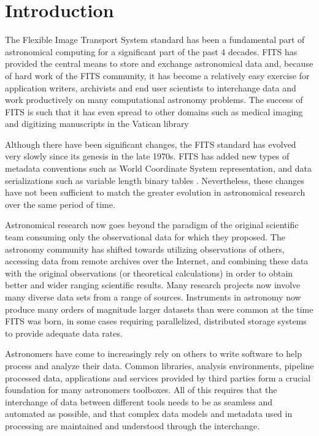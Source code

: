 \documentclass[11pt,twoside]{article}
\begin{document}
\section{Introduction}

The Flexible Image Transport System standard
\citep[FITS;][]{1981A&AS...44..363W,2001A&A...376..359H,2010A&A...524A..42P}
has been a fundamental part of astronomical computing for a
significant part of the past 4 decades. FITS has provided the central
means to store and exchange astronomical data and, because of hard
work of the FITS community, it has become a relatively easy exercise
for application writers, archivists and end user scientists to
interchange data and work productively on many computational astronomy
problems. The success of FITS is such that it has even spread to other
domains such as medical imaging and digitizing manuscripts in the
Vatican library
\citep[ascl:1206.013,][]{2006JRASC.100..242W,2012EWASSAlle}


Although there have been significant changes, the FITS standard has
evolved very slowly since its genesis in the late 1970s. FITS has
added new types of metadata conventions such as World Coordinate
System
\citep[WCS;][]{2002A&A...395.1061G,2002A&A...395.1077C,2006A&A...446..747G}
representation, and data serializations such as variable length binary
tables \citep{1995A&AS..113..159C}. Nevertheless, these changes have
not been sufficient to match the greater evolution in astronomical
research over the same period of time.

Astronomical research now goes beyond the paradigm of the original
scientific team consuming only the observational data for which they
proposed. The astronomy community has shifted towards utilizing
observations of others, accessing data from remote archives over the
Internet, and combining these data with the original observations (or
theoretical calculations) in order to obtain better and wider ranging
scientific results. Many research projects now involve many diverse
data sets from a range of sources. Instruments in astronomy now
produce many orders of magnitude larger datasets than were common at
the time FITS was born, in some cases
\citep[e.g.][]{2012ASPC..461..283A} requiring parallelized,
distributed storage systems to provide adequate data rates.

Astronomers have come to increasingly rely on others to write software
to help process and analyze their data. Common libraries, analysis
environments, pipeline processed data, applications and services
provided by third parties form a crucial foundation for many
astronomers toolboxes. All of this requires that the interchange of
data between different tools needs to be as seamless and automated as
possible, and that complex data models and metadata used in processing
are maintained and understood through the interchange.
\end{document}
